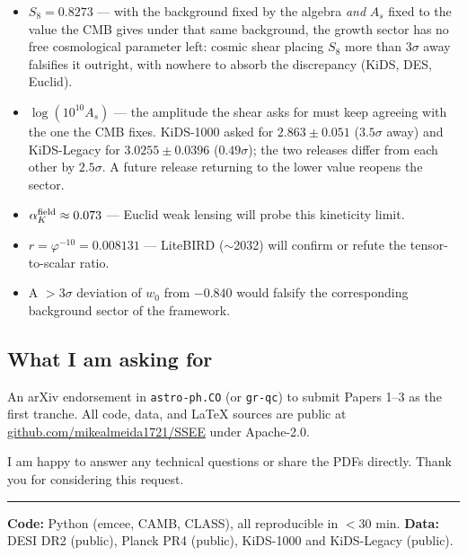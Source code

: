 \documentclass[11pt,a4paper]{article}
\begin{document}
\begin{itemize}
  \item $S_8=0.8273$ — with the background fixed by the algebra \emph{and}
    $A_s$ fixed to the value the CMB gives under that same background, the
    growth sector has no free cosmological parameter left: cosmic shear
    placing $S_8$ more than $3\sigma$ away falsifies it outright, with nowhere
    to absorb the discrepancy (KiDS, DES, Euclid).
  \item $\log(10^{10}A_s)$ — the amplitude the shear asks for must keep
    agreeing with the one the CMB fixes. KiDS-1000 asked for $2.863\pm0.051$
    ($3.5\sigma$ away) and KiDS-Legacy for $3.0255\pm0.0396$ ($0.49\sigma$);
    the two releases differ from each other by $2.5\sigma$. A future release
    returning to the lower value reopens the sector.
  \item $\alpha_K^{\rm field} \approx 0.073$ — Euclid weak lensing will probe this kineticity limit.
  \item $r=\varphi^{-10}=0.008131$ — LiteBIRD ($\sim$2032) will confirm or refute the tensor-to-scalar ratio.
  \item A $>3\sigma$ deviation of $w_0$ from $-0.840$ would falsify the corresponding background sector of the framework.
\end{itemize}

\subsection*{What I am asking for}

An arXiv endorsement in \texttt{astro-ph.CO} (or \texttt{gr-qc}) to submit
Papers 1--3 as the first tranche. All code, data, and \LaTeX{} sources are
public at \href{https://github.com/mikealmeida1721/SSEE}{github.com/mikealmeida1721/SSEE}
under Apache-2.0.

I am happy to answer any technical questions or share the PDFs directly.
Thank you for considering this request.

\vspace{6pt}
\hrule
{\small \textbf{Code:} Python (emcee, CAMB, CLASS), all reproducible in $<$30 min.
\quad \textbf{Data:} DESI DR2 (public), Planck PR4 (public), KiDS-1000 and
KiDS-Legacy (public).}
\end{document}
